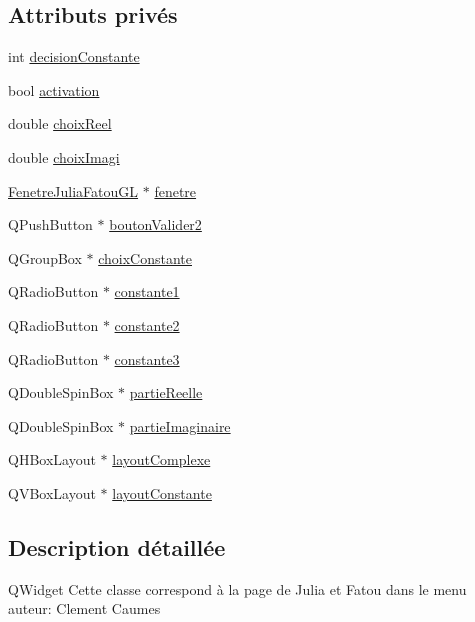 \subsection*{Attributs privés}
\begin{DoxyCompactItemize}
\item 
int \hyperlink{classOngletChoix_a184324fb8c1620faad40c00d1f79e8f2}{decision\+Constante}
\item 
bool \hyperlink{classOngletChoix_a29c93f2a3b2c5a3c77df221706b9f038}{activation}
\item 
double \hyperlink{classOngletChoix_aa2baa10f52ae85feef9d1e52e0e37109}{choix\+Reel}
\item 
double \hyperlink{classOngletChoix_aa33e3bfaff29c28b69fd9ec5cc95b45c}{choix\+Imagi}
\item 
\hyperlink{classFenetreJuliaFatouGL}{Fenetre\+Julia\+Fatou\+GL} $\ast$ \hyperlink{classOngletChoix_a7a71fce7b0e4167c7aaf96ddd863dce0}{fenetre}
\item 
Q\+Push\+Button $\ast$ \hyperlink{classOngletChoix_a4e7f94f9b6287dd0d75f78d1074aa57f}{bouton\+Valider2}
\item 
Q\+Group\+Box $\ast$ \hyperlink{classOngletChoix_a81223bf8a97a8361bf69f8b39de98477}{choix\+Constante}
\item 
Q\+Radio\+Button $\ast$ \hyperlink{classOngletChoix_ab27daac5b741b88a2e952f098f01436c}{constante1}
\item 
Q\+Radio\+Button $\ast$ \hyperlink{classOngletChoix_aa2dcda0ff628b623d799d11e85966587}{constante2}
\item 
Q\+Radio\+Button $\ast$ \hyperlink{classOngletChoix_a4161297e6349dce61541d0375fcf6071}{constante3}
\item 
Q\+Double\+Spin\+Box $\ast$ \hyperlink{classOngletChoix_aaa7381931138a3b546b87c40351422be}{partie\+Reelle}
\item 
Q\+Double\+Spin\+Box $\ast$ \hyperlink{classOngletChoix_a32bb19f4786c98b681f2476a0c214465}{partie\+Imaginaire}
\item 
Q\+H\+Box\+Layout $\ast$ \hyperlink{classOngletChoix_a8a0459cfcd7ef21e702dfe35b6727831}{layout\+Complexe}
\item 
Q\+V\+Box\+Layout $\ast$ \hyperlink{classOngletChoix_abd71bbe403300b04b30911273987757d}{layout\+Constante}
\end{DoxyCompactItemize}


\subsection{Description détaillée}
Q\+Widget Cette classe correspond à la page de Julia et Fatou dans le menu auteur\+: Clement Caumes 

